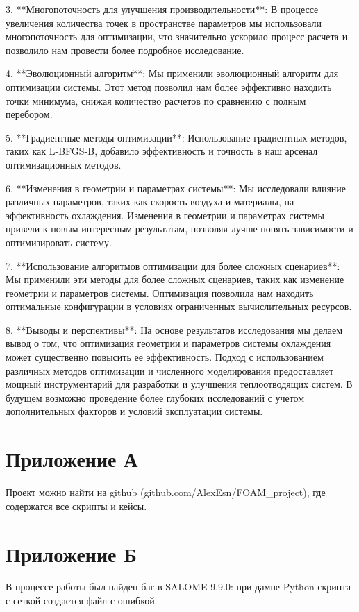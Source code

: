 \documentclass[a4paper,12pt]{article}
\theoremstyle{plain} %
\theoremstyle{definition} %
\theoremstyle{remark} %
\begin{document}
3. **Многопоточность для улучшения производительности**: В процессе увеличения количества точек в пространстве параметров мы использовали многопоточность для оптимизации, что значительно ускорило процесс расчета и позволило нам провести более подробное исследование.

4. **Эволюционный алгоритм**: Мы применили эволюционный алгоритм для оптимизации системы. Этот метод позволил нам более эффективно находить точки минимума, снижая количество расчетов по сравнению с полным перебором.

5. **Градиентные методы оптимизации**: Использование градиентных методов, таких как L-BFGS-B, добавило эффективность и точность в наш арсенал оптимизационных методов.

6. **Изменения в геометрии и параметрах системы**: Мы исследовали влияние различных параметров, таких как скорость воздуха и материалы, на эффективность охлаждения. Изменения в геометрии и параметрах системы привели к новым интересным результатам, позволяя лучше понять зависимости и оптимизировать систему.

7. **Использование алгоритмов оптимизации для более сложных сценариев**: Мы применили эти методы для более сложных сценариев, таких как изменение геометрии и параметров системы. Оптимизация позволила нам находить оптимальные конфигурации в условиях ограниченных вычислительных ресурсов.

8. **Выводы и перспективы**: На основе результатов исследования мы делаем вывод о том, что оптимизация геометрии и параметров системы охлаждения может существенно повысить ее эффективность. Подход с использованием различных методов оптимизации и численного моделирования предоставляет мощный инструментарий для разработки и улучшения теплоотводящих систем. В будущем возможно проведение более глубоких исследований с учетом дополнительных факторов и условий эксплуатации системы.

\newpage

\newpage
\section{Приложение А}
Проект можно найти на github (github.com/AlexEsn/FOAM\_project), где содержатся все скрипты и кейсы.

\newpage
\section{Приложение Б}
В процессе работы был найден баг в SALOME-9.9.0: при дампе Python скрипта с сеткой создается файл с ошибкой.
\end{document}
